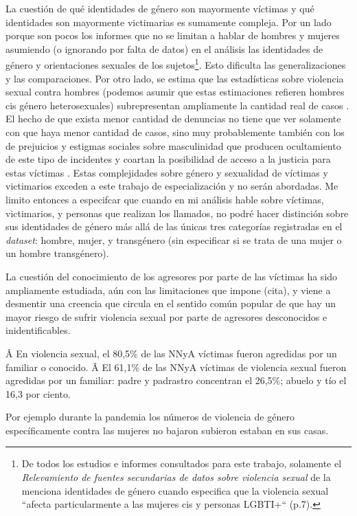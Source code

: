 \documentclass[10 pt]{article}
\begin{document}
La cuestión de qué identidades de género son mayormente víctimas y qué identidades son mayormente victimarias es sumamente compleja. Por un lado porque son pocos los informes que no se limitan a hablar de hombres y mujeres asumiendo (o ignorando por falta de datos) en el análisis las identidades de género y orientaciones sexuales de los sujetos\footnote{De todos los estudios e informes consultados para este trabajo, solamente el \textit{Relevamiento de fuentes secundarias de datos sobre violencia sexual} de la \citet{ufem_relevamiento} menciona identidades de género cuando especifica que la violencia sexual “afecta particularmente a las mujeres cis y personas LGBTI+“ (p.7).}. Esto dificulta las generalizaciones y las comparaciones. Por otro lado, se estima que las estadísticas sobre violencia sexual contra hombres (podemos asumir que estas estimaciones refieren hombres cis género heterosexuales) subrepresentan ampliamente la cantidad real de casos \citep*[p.~149]{ferris2002world}. El hecho de que exista menor cantidad de denuncias no tiene que ver solamente con que haya menor cantidad de casos, sino muy probablemente también con los de prejuicios y estigmas sociales sobre masculinidad que producen ocultamiento de este tipo de incidentes y coartan la posibilidad de acceso a la justicia para estas víctimas \citep*[p.~149]{ferris2002world}. Estas complejidades sobre género y sexualidad de víctimas y victimarios exceden a este trabajo de especialización y no serán abordadas. Me limito entonces a especifcar que cuando en mi análisis hable sobre víctimas, victimarios, y personas que realizan los llamados, no podré hacer distinción sobre sus identidades de género más allá de las únicas tres categorías registradas en el \textit{dataset}: hombre, mujer, y transgénero (sin especificar si se trata de una mujer o un hombre transgénero).  

La cuestión del conocimiento de los agresores por parte de las víctimas ha sido ampliamente estudiada, aún con las limitaciones que impone (cita), y viene a desmentir una creencia que circula en el sentido común popular de que hay un mayor riesgo de sufrir violencia sexual por parte de agresores desconocidos e inidentificables.  

Â En violencia sexual, el 80,5\% de las NNyA víctimas fueron agredidas por un familiar o conocido.
Â El 61,1\% de las NNyA víctimas de violencia sexual fueron agredidas por un familiar: padre y padrastro concentran el 26,5\%; abuelo y tío el 16,3 por ciento.

Por ejemplo durante la pandemia los números de violencia de género específicamente contra las mujeres no bajaron subieron estaban en sus casas.
\end{document}
